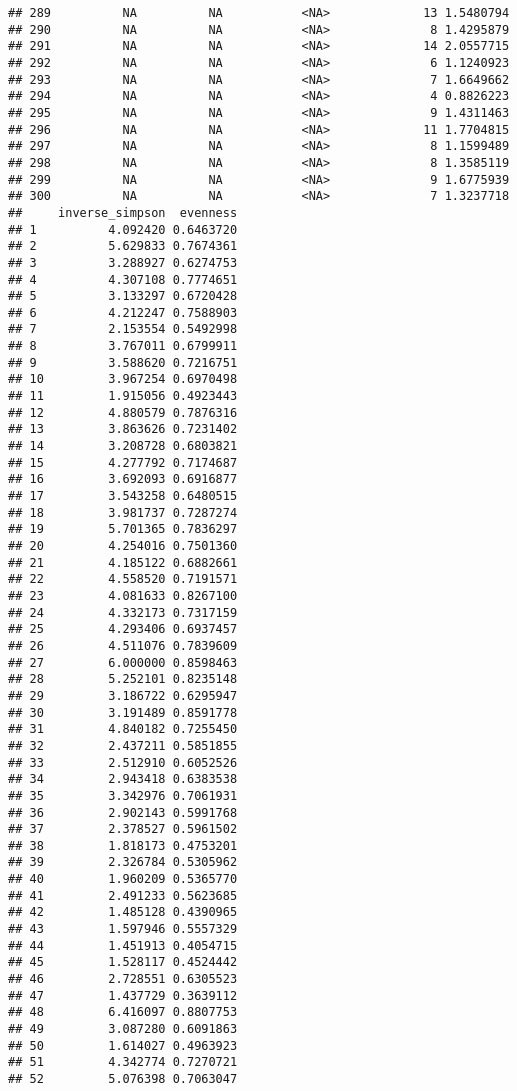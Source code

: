 \documentclass[]{article}
\begin{document}
\begin{verbatim}
## 289          NA          NA           <NA>             13 1.5480794
## 290          NA          NA           <NA>              8 1.4295879
## 291          NA          NA           <NA>             14 2.0557715
## 292          NA          NA           <NA>              6 1.1240923
## 293          NA          NA           <NA>              7 1.6649662
## 294          NA          NA           <NA>              4 0.8826223
## 295          NA          NA           <NA>              9 1.4311463
## 296          NA          NA           <NA>             11 1.7704815
## 297          NA          NA           <NA>              8 1.1599489
## 298          NA          NA           <NA>              8 1.3585119
## 299          NA          NA           <NA>              9 1.6775939
## 300          NA          NA           <NA>              7 1.3237718
##     inverse_simpson  evenness
## 1          4.092420 0.6463720
## 2          5.629833 0.7674361
## 3          3.288927 0.6274753
## 4          4.307108 0.7774651
## 5          3.133297 0.6720428
## 6          4.212247 0.7588903
## 7          2.153554 0.5492998
## 8          3.767011 0.6799911
## 9          3.588620 0.7216751
## 10         3.967254 0.6970498
## 11         1.915056 0.4923443
## 12         4.880579 0.7876316
## 13         3.863626 0.7231402
## 14         3.208728 0.6803821
## 15         4.277792 0.7174687
## 16         3.692093 0.6916877
## 17         3.543258 0.6480515
## 18         3.981737 0.7287274
## 19         5.701365 0.7836297
## 20         4.254016 0.7501360
## 21         4.185122 0.6882661
## 22         4.558520 0.7191571
## 23         4.081633 0.8267100
## 24         4.332173 0.7317159
## 25         4.293406 0.6937457
## 26         4.511076 0.7839609
## 27         6.000000 0.8598463
## 28         5.252101 0.8235148
## 29         3.186722 0.6295947
## 30         3.191489 0.8591778
## 31         4.840182 0.7255450
## 32         2.437211 0.5851855
## 33         2.512910 0.6052526
## 34         2.943418 0.6383538
## 35         3.342976 0.7061931
## 36         2.902143 0.5991768
## 37         2.378527 0.5961502
## 38         1.818173 0.4753201
## 39         2.326784 0.5305962
## 40         1.960209 0.5365770
## 41         2.491233 0.5623685
## 42         1.485128 0.4390965
## 43         1.597946 0.5557329
## 44         1.451913 0.4054715
## 45         1.528117 0.4524442
## 46         2.728551 0.6305523
## 47         1.437729 0.3639112
## 48         6.416097 0.8807753
## 49         3.087280 0.6091863
## 50         1.614027 0.4963923
## 51         4.342774 0.7270721
## 52         5.076398 0.7063047

\end{verbatim}
\end{document}

